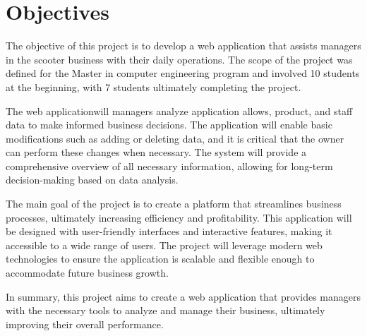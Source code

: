 \section{Objectives}
The objective of this project is to develop a web application that assists managers in the scooter business with their daily operations. The scope of the project was defined for the Master in computer engineering program and involved 10 students at the beginning, with 7 students ultimately completing the project. 

\vspace{10pt}

The web applicationwill managers  analyze application allows, product, and staff data to make informed business decisions. The application will enable basic modifications such as adding or deleting data, and it is critical that the owner can perform these changes when necessary. The system will provide a comprehensive overview of all necessary information, allowing for long-term decision-making based on data analysis.

\vspace{10pt}

The main goal of the project is to create a platform that streamlines business processes, ultimately increasing efficiency and profitability. This application will be designed with user-friendly interfaces and interactive features, making it accessible to a wide range of users. The project will leverage modern web technologies to ensure the application is scalable and flexible enough to accommodate future business growth.

\vspace{10pt}

In summary, this project aims to create a web application that provides managers with the necessary tools to analyze and manage their business, ultimately improving their overall performance.





